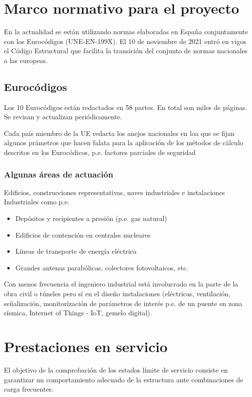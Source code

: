 \section{Marco normativo para el proyecto}  
En la actualidad se están utilizando normas elaboradas en España conjuntamente con los Eurocódigos (UNE-EN-199X). El 10 de noviembre de 2021 entró en vigos el Código Estructural que facilita la transición del conjunto de normas nacionales a las europeas.

\subsection{Eurocódigos}
Los 10 Eurocódigos están redactados en 58 partes. En total son miles de páginas. Se revisan y actualizan periódicamente.

Cada país miembro de la UE redacta los anejos nacionales en loa que se fijan algunos prámetros que hacen falata para la aplicación de los métodos de cálculo descritos en los Eurocódicos, p.e. factores parciales de seguridad

\subsubsection{Algunas áreas de actuación}

Edificios, construcciones representativas, naves industriales e instalaciones Industriales como p.e.
\begin{itemize}
    \item Depósitos y recipientes a presión (p.e. gas natural)
    \item Edificios de contención en centrales nucleares
    \item Líneas de transporte de energía eléctrica
    \item Grandes antenas parabólicas, colectores fotovoltaicos, etc.
\end{itemize}

Con menos frecuencia el ingeniero industrial está involucrado en la parte de la obra civil o túneles pero sí en el diseño instalaciones (eléctricas, ventilación, señalización, monitorización de parámetros de interés p.e. de un puente en zona sísmica, Internet of Things - IoT, gemelo digital).

\section{Prestaciones en servicio}

El objetivo de la comprobación de los estados límite de servicio consiste en garantizar un comportamiento adecuado de la estructura ante combinaciones de carga frecuentes.

